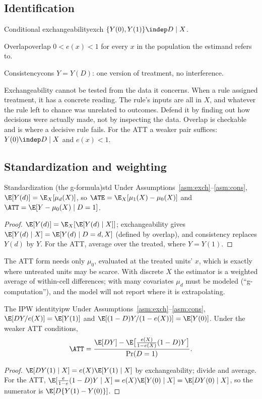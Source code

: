 \documentclass[11pt]{article}
\begin{document}
\subsection{Identification}

\begin{assum}{Conditional exchangeability}{exch}
$\{Y(0), Y(1)\} \indep D \mid X$.
\end{assum}
\begin{assum}{Overlap}{overlap}
$0 < e(x) < 1$ for every $x$ in the population the estimand refers to.
\end{assum}
\begin{assum}{Consistency}{cons}
$Y = Y(D)$: one version of treatment, no interference.
\end{assum}

Exchangeability cannot be tested from the data it concerns. When a rule assigned treatment, it has a concrete reading. The
rule's inputs are all in $X$, and whatever the rule left to chance was unrelated to outcomes. Defend it by finding out how
decisions were actually made, not by inspecting the data. Overlap is checkable and is where a decisive rule fails. For the ATT a weaker
pair suffices: $Y(0) \indep D \mid X$ and $e(x) < 1$.

\subsection{Standardization and weighting}

\begin{prop}{Standardization (the g-formula)}{std}
Under Assumptions~\ref{asm:exch}--\ref{asm:cons}, $\E[Y(d)] = \E_X[\mu_d(X)]$, so $\ATE = \E_X[\mu_1(X) - \mu_0(X)]$ and
$\ATT = \E[Y - \mu_0(X) \mid D = 1]$.
\end{prop}
\begin{proof}
$\E[Y(d)] = \E_X[\E[Y(d) \mid X]]$; exchangeability gives $\E[Y(d) \mid X] = \E[Y(d) \mid D=d, X]$ (defined by overlap), and
consistency replaces $Y(d)$ by $Y$. For the ATT, average over the treated, where $Y = Y(1)$.
\end{proof}

The ATT form needs only $\mu_0$, evaluated at the treated units' $x$, which is exactly where untreated units may be scarce.
With discrete $X$ the estimator is a weighted average of within-cell differences; with many covariates $\mu_d$ must be
modeled (``g-computation''), and the model will not report where it is extrapolating.

\begin{prop}{The IPW identity}{ipw}
Under Assumptions~\ref{asm:exch}--\ref{asm:cons}, $\E[DY/e(X)] = \E[Y(1)]$ and $\E[(1-D)Y/(1-e(X))] = \E[Y(0)]$. Under the
weaker ATT conditions,
\[
  \ATT = \frac{\E[DY] - \E\big[\tfrac{e(X)}{1-e(X)}(1-D)Y\big]}{\Pr(D=1)} .
\]
\end{prop}
\begin{proof}
$\E[DY(1) \mid X] = e(X)\E[Y(1) \mid X]$ by exchangeability; divide and average. For the ATT,
$\E[\tfrac{e}{1-e}(1-D)Y \mid X] = e(X)\E[Y(0) \mid X] = \E[DY(0) \mid X]$, so the numerator is $\E[D\{Y(1) - Y(0)\}]$.
\end{proof}
\end{document}
